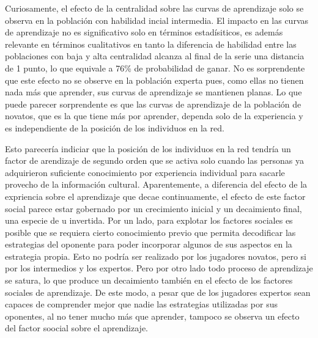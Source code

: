 \documentclass[a4paper,11pt]{book}
\theoremstyle{definition}
\begin{document}
Curiosamente, el efecto de la centralidad sobre las curvas de aprendizaje solo se observa en la población con habilidad incial intermedia.
%
El impacto en las curvas de aprendizaje no es significativo solo en términos estadísiticos, es además relevante en términos cualitativos en tanto la diferencia de habilidad entre las poblaciones con baja y alta centralidad alcanza al final de la serie una distancia de 1 punto, lo que equivale a 76\% de probabilidad de ganar.
%
No es sorprendente que este efecto no se observe en la población experta pues, como ellas no tienen nada más que aprender, sus curvas de aprendizaje se mantienen planas.
%
Lo que puede parecer sorprendente es que las curvas de aprendizaje de la población de novatos, que es la que tiene más por aprender, dependa solo de la experiencia y es independiente de la posición de los individuos en la red.
%
%

Esto parecería indiciar que la posición de los individuos en la red tendría un factor de arendizaje de segundo orden que se activa solo cuando las personas ya adquirieron suficiente conocimiento por experiencia individual para sacarle provecho de la información cultural.
%
%
%
%
%
%
%
%
Aparentemente, a diferencia del efecto de la expriencia sobre el aprendizaje que decae continuamente, el efecto de este factor social parece estar gobernado por un crecimiento inicial y un decaimiento final, una especie de u invertida.
%
Por un lado, para explotar los factores sociales es posible que se requiera cierto conocimiento previo que permita decodificar las estrategias del oponente para poder incorporar algunos de sus aspectos en la estrategia propia.
%
Esto no podría ser realizado por los jugadores novatos, pero si por los intermedios y los expertos.
%
Pero por otro lado todo proceso de aprendizaje se satura, lo que produce un decaimiento también en el efecto de los factores sociales de aprendizaje.
%
De este modo, a pesar que de los jugadores expertos sean capaces de comprender mejor que nadie las estrategias utilizadas por sus oponentes, al no tener mucho más que aprender, tampoco se observa un efecto del factor soocial sobre el aprendizaje.
%
%
\end{document}
